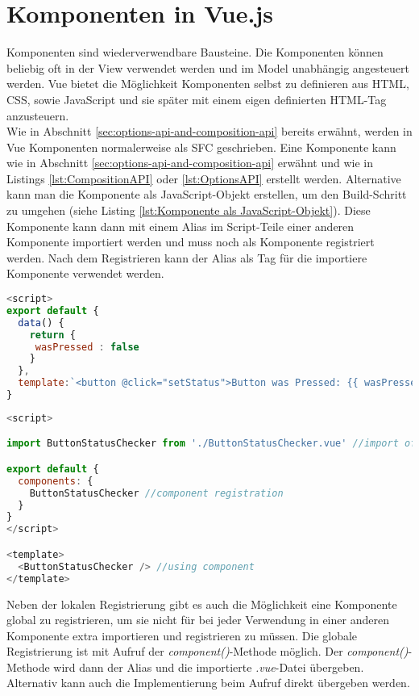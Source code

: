 \section{Komponenten in Vue.js}\label{sec:komponenten-in-vue.js}
Komponenten sind wiederverwendbare Bausteine.
Die Komponenten können beliebig oft in der View verwendet werden und im Model unabhängig angesteuert werden.
Vue bietet die Möglichkeit Komponenten selbst zu definieren aus HTML, CSS, sowie JavaScript und sie später mit einem
eigen definierten HTML-Tag anzusteuern.\cite[S. 11-12]{steyer2019}
\\
Wie in Abschnitt \ref{sec:options-api-and-composition-api} bereits erwähnt, werden in Vue Komponenten normalerweise als SFC geschrieben.
Eine Komponente kann wie in Abschnitt \ref{sec:options-api-and-composition-api} erwähnt und wie in Listings \ref{lst:CompositionAPI} oder \ref{lst:OptionsAPI}
erstellt werden.
Alternative kann man die Komponente als JavaScript-Objekt erstellen, um den Build-Schritt zu umgehen (siehe Listing \ref{lst:Komponente als JavaScript-Objekt}).
Diese Komponente kann dann mit einem Alias im Script-Teile einer anderen Komponente importiert werden und muss noch als Komponente
registriert werden.
Nach dem Registrieren kann der Alias als Tag für die importiere Komponente verwendet werden. \cite{vueComponents}


\begin{lstlisting}[caption={Komponente als JavaScript-Objekt},language=javascript,label={lst:Komponente als JavaScript-Objekt}]
<script>
export default {
  data() {
    return {
     wasPressed : false
    }
  },
  template:`<button @click="setStatus">Button was Pressed: {{ wasPressed }}</button>`
}
\end{lstlisting}


\begin{lstlisting}[caption={Verwendung einer Komponente},language=javascript,label={lst:Verwendung einer Komponente}]
<script>

import ButtonStatusChecker from './ButtonStatusChecker.vue' //import of component

export default {
  components: {
    ButtonStatusChecker //component registration
  }
}
</script>

<template>
  <ButtonStatusChecker /> //using component
</template>
\end{lstlisting}

Neben der lokalen Registrierung gibt es auch die Möglichkeit eine Komponente global
zu registrieren, um sie nicht für bei jeder Verwendung in einer anderen Komponente
extra importieren und registrieren zu müssen.
Die globale Registrierung ist mit Aufruf der \emph{component()}-Methode möglich.
Der \emph{component()}-Methode wird dann der Alias und die importierte \emph{.vue}-Datei übergeben.
Alternativ kann auch die Implementierung beim Aufruf direkt übergeben werden. \cite{vueComponentsRegistration}

